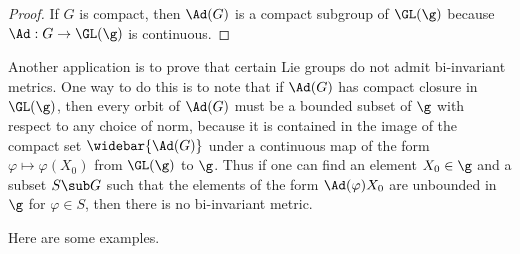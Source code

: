 \begin{proof}
If $G$ is compact, then $\Ad(G)$ is a compact subgroup of $\GL(\g)$ because $\Ad:G\to\GL(\g)$ 
is continuous.
\end{proof}
Another application is to prove that certain Lie groups do not admit bi-invariant 
metrics. One way to do this is to note that if $\Ad(G)$ has compact closure in $\GL(\g)$, 
then every orbit of $\Ad(G)$ must be a bounded subset of $\g$ with respect to any choice of 
norm, because it is contained in the image of the compact set $\widebar{\Ad(G)}$ under a 
continuous map of the form $\varphi\mapsto\varphi(X_0)$ from $\GL(\g)$ to $\g$. Thus if one 
can find an element $X_0\in\g$ and a subset $S\sub G$ such that the elements of the form 
$\Ad(\varphi)X_0$ are unbounded in $\g$ for $\varphi\in S$, then there is no bi-invariant 
metric.\par
Here are some examples.
